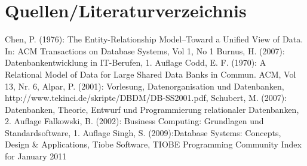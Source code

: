 \chapter*{Quellen/Literaturverzeichnis}



Chen, P. (1976): The Entity-Relationship Model--Toward a Unified View of Data. In: ACM Transactions on Database Systems, Vol 1, No 1
Burnus, H. (2007): Datenbankentwicklung in IT-Berufen, 1. Auflage
Codd, E. F. (1970): A Relational Model of Data for Large Shared Data Banks in Commun. ACM, Vol 13, Nr. 6,
Alpar, P. (2001): Vorlesung, Datenorganisation und Datenbanken,  http://www.tekinci.de/skripte/DBDM/DB-SS2001.pdf,
Schubert, M. (2007): Datenbanken, Theorie, Entwurf und Programmierung relationaler Datenbanken, 2. Auflage
Falkowski, B. (2002): Business Computing: Grundlagen und Standardsoftware, 1. Auflage
Singh, S. (2009):Database Systems: Concepts, Design \& Applications, 
Tiobe Software, TIOBE Programming Community Index for January 2011
